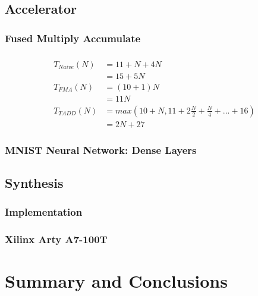 \documentclass[a4paper,9pt]{report}
\begin{document}
\section{Accelerator}
\subsection{Fused Multiply Accumulate}




\subsection{}

\begin{align*}
  T_{Naive}(N) &= 11+N + 4N \\
  &= 15 + 5N \\
  T_{FMA}(N) &= (10+1)N \\
             &= 11N \\
  T_{TADD}(N) &= max(10+N, 11+2\frac{N}{2} + \frac{N}{4} + ... + 16) \\
             &= 2N+27 
\end{align*}




\subsection{MNIST Neural Network: Dense Layers}

\section{Synthesis}
\subsection{Implementation}
\subsection{Xilinx Arty A7-100T}

\chapter{Summary and Conclusions} 


\appendix
\singlespacing

 
% 
\end{document}
